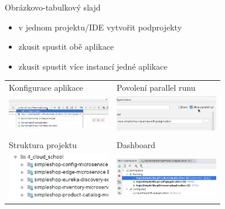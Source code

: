 \documentclass{beamer}							%
\begin{document}
\begin{frame}[fragile, shrink=0]{Obrázkovo-tabulkový slajd}
	\begin{itemize}
		\item v jednom projektu/IDE vytvořit podprojekty
		\item zkusit spustit obě aplikace
		\item zkusit spustit více instancí jedné aplikace

	\end{itemize}

	\begin{tabular}{ll}
		\\
		Konfigurace aplikace                                             & Povolení parallel runu                                                        \\
		\includegraphics[width=4.5cm]{images/idea-app-configuration.png} & \includegraphics[width=4.5cm]{images/idea-app-configuration-parallel-run.png} \\
		\\
		Struktura projektu                                               & Dashboard                                                                     \\
		\includegraphics[width=4.5cm]{images/idea-project-structure.png} & \includegraphics[width=4.5cm]{images/idea-spring-boot-dashboard.png}          \\
	\end{tabular}
\end{frame}
\end{document}
